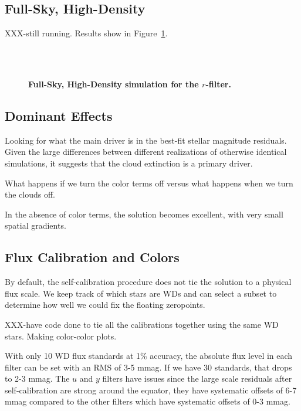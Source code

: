 \documentclass[12pt,preprint]{aastex}
\begin{document}
\subsection{Full-Sky, High-Density}

XXX-still running.  Results show in Figure~\ref{fig:25mil}.

\begin{figure}
 \\
 \\
\caption{ {\bf Full-Sky, High-Density simulation for the $r$-filter.  }  \label{fig:25mil}}
\end{figure}

\subsection{Dominant Effects}

Looking for what the main driver is in the best-fit stellar magnitude residuals.  Given the large differences between different realizations of otherwise identical simulations, it suggests that the cloud extinction is a primary driver.  

What happens if we turn the color terms off versus what happens when we turn the clouds off.  

In the absence of color terms, the solution becomes excellent, with very small spatial gradients.  

\subsection{Flux Calibration and Colors}\label{sec:fluxcal}

By default, the self-calibration procedure does not tie the solution to a physical flux scale.  We keep track of which stars are WDs and can select a subset to determine how well we could fix the floating zeropoints.  

XXX-have code done to tie all the calibrations together using the same WD stars.  Making color-color plots.


With only 10 WD flux standards at 1\% accuracy, the absolute flux level in each filter can be set with an RMS of 3-5 mmag.  If we have 30 standards, that drops to 2-3 mmag.  The $u$ and $y$ filters have issues since the large scale residuals after self-calibration are strong around the equator, they have systematic offsets of 6-7 mmag compared to the other filters which have systematic offsets of 0-3 mmag.  
\end{document}
